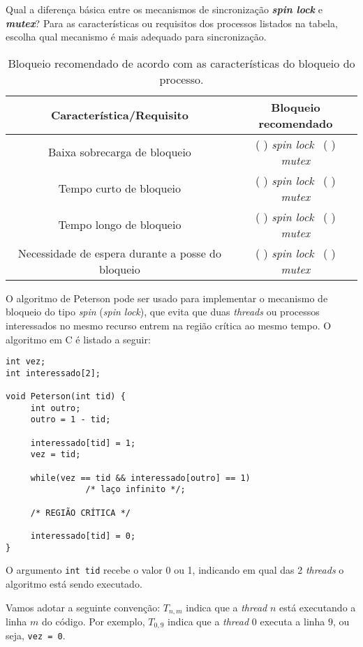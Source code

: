   \question[1] Qual a diferença básica entre os mecanismos de
  sincronização {\bf \em spin lock} e {\em \bf mutex}? Para as
  características ou requisitos dos processos listados na tabela,
  escolha qual mecanismo é mais adequado para sincronização.
  \bigskip
  \def\whichlock{( ) {\em spin lock}\hbox{     } ( ) {\em mutex}}
  \begin{table}[h]
    \centering
    \begin{tabular}{|c|c|}\hline
      \bf Característica/Requisito & \bf Bloqueio recomendado\\\hline\hline
      Baixa sobrecarga de bloqueio & \whichlock\\\hline
      Tempo curto de bloqueio & \whichlock\\\hline
      Tempo longo de bloqueio & \whichlock\\\hline
      Necessidade de espera durante a posse do bloqueio & \whichlock\\\hline
    \end{tabular}
    \caption{Bloqueio recomendado de acordo com as características do
      bloqueio do processo.}
    \label{so:sync}
  \end{table}


\question[3] O algoritmo de Peterson pode ser usado para implementar
o mecanismo de bloqueio do tipo {\em spin} ({\em spin lock}), que evita
que duas {\em threads} ou processos interessados no mesmo recurso entrem
na região crítica ao mesmo tempo. O algoritmo em {\sc C} é listado a seguir:

\begin{lstlisting}
int vez; 
int interessado[2]; 

void Peterson(int tid) { 
     int outro; 
     outro = 1 - tid; 

     interessado[tid] = 1; 
     vez = tid; 

     while(vez == tid && interessado[outro] == 1)
                /* laço infinito */;

     /* REGIÃO CRÍTICA */

     interessado[tid] = 0;
}
\end{lstlisting}

\noindent O argumento {\tt int tid} recebe o valor 0 ou 1, indicando em qual das
2 {\em threads} o algoritmo está sendo executado.

Vamos adotar a seguinte convenção: $T_{n,m}$ indica que a {\em thread}
$n$ está executando a linha $m$ do código. Por exemplo, $T_{0,9}$
indica que a {\em thread} $0$ executa a linha $9$, ou seja, {\tt vez =
0}.

